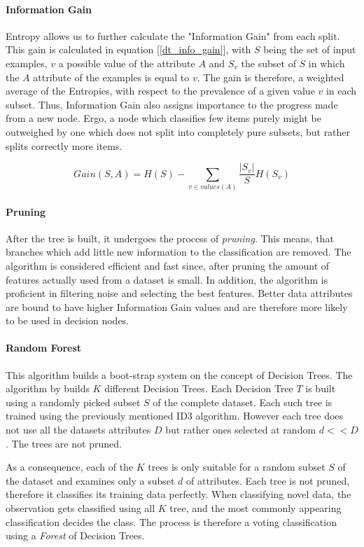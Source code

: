 	 \paragraph{Information Gain}	
	 	Entropy allows us to further calculate the "Information Gain" from each split. This gain is calculated in equation [\ref{dt_info_gain}], with $ S $ being the set of input examples, $ v $ a possible value of the attribute $ A $ and $ S_v $ the subset of $ S $ in which the $ A $ attribute of the examples is equal to $ v $. The gain is therefore, a weighted average of the Entropies, with respect to the prevalence of a given value $ v $ in each subset. Thus, Information Gain also assigns importance to the progress made from a new node. Ergo, a node which classifies few items purely might be outweighed by one which does not split into completely pure subsets, but rather splits correctly more items.
	 
			\begin{equation}
			Gain(S,A) = H(S) - \sum_{v \in values(A) } \frac{|S_v|}{S} H(S_v)
			\label{dt_info_gain}
	 \end{equation}
	 
	 \paragraph{Pruning}
		 After the tree is built, it undergoes the process of \textit{pruning}. This means, that branches which add little new information to the classification are removed. The algorithm is considered efficient and fast since, after pruning the amount of features actually used from a dataset is small. In addition, the algorithm is proficient in filtering noise and selecting the best features. Better data attributes are bound to have higher Information Gain values and are therefore more likely to be used in decision nodes.
	
	\paragraph{Random Forest}
		This algorithm builds a boot-strap system on the concept of Decision Trees. The algorithm by \cite{breiman1984classification} builds $ K $ different Decision Trees. Each Decision Tree $ T $ is built using a randomly picked subset $ S $ of the complete dataset. Each such tree is trained using the previously mentioned ID3 algorithm. However each tree does not use all the datasets attributes $ D $ but rather ones selected at random $ d << D $. The trees are not pruned. 
		
		\par
		As a consequence, each of the $ K $ trees is only suitable for a random subset $ S $ of the dataset and examines only a subset $ d $ of attributes. Each tree is not pruned, therefore it classifies its training data perfectly. When classifying novel data, the observation gets classified using all $ K $ tree, and the most commonly appearing classification decides the class. The process is therefore a voting classification using a \textit{Forest} of Decision Trees.
 
	
	
